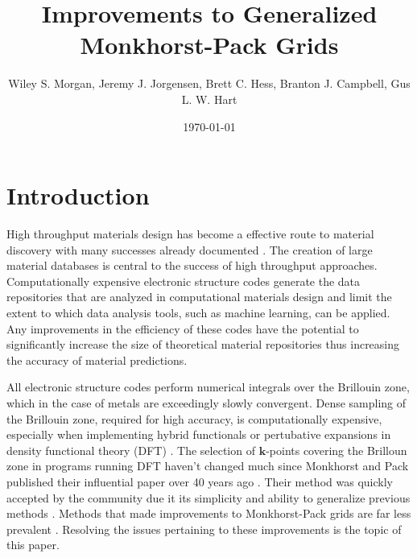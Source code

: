 \documentclass[ reprint,
 amsmath,amssymb, aps,
prb,
showpacs ]{revtex4-1}
\begin{document}

\title{Improvements to Generalized Monkhorst-Pack Grids}

\author{Wiley S. Morgan, Jeremy J. Jorgensen, Brett C. Hess, Branton
  J. Campbell, Gus L. W. Hart} 


\date{\today}%
\begin{abstract}

  
\end{abstract}

\maketitle

\section{Introduction}
High throughput materials design has become a effective route to
material discovery with many successes already documented
\cite{greeley2006computational, hanak2004quantum,
  green2013applications, xiang1995combinatorial,
  jandeleit1999combinatorial, senkan1998high}. The creation of large
material databases is central to the success of high throughput
approaches. Computationally expensive electronic structure codes
generate the data repositories that are analyzed in computational
materials design and limit the extent to which data analysis tools,
such as machine learning, can be applied. Any improvements in the
efficiency of these codes have the potential to significantly increase
the size of theoretical material repositories thus increasing the
accuracy of material predictions.

All electronic structure codes perform numerical integrals over the
Brillouin zone, which in the case of metals are exceedingly slowly
convergent. Dense sampling of the Brillouin zone, required for high
accuracy, is computationally expensive, especially when implementing
hybrid functionals or pertubative expansions in density functional
theory (DFT) \cite{berland2017enabling}. The selection of
$\mathbf{k}$-points covering the Brilloun zone in programs running DFT
haven't changed much since Monkhorst and Pack published their
influential paper over 40 years ago \cite{monkhorst1976special}. Their
method was quickly accepted by the community due it its simplicity and
ability to generalize previous methods \cite{baldereschi1973mean,
  chadi1973special}. Methods that made improvements to Monkhorst-Pack
grids are far less prevalent \cite{froyen1989brillouin, moreno1992optimal,
  wisesa2016efficient}. Resolving the issues pertaining to these
improvements is the topic of this paper.
\end{document}
